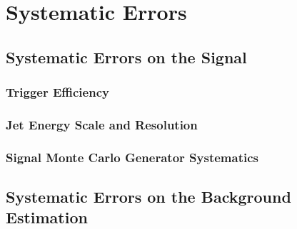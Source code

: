  

\chapter[Systematic Errors]{Systematic Errors}

\section{Systematic Errors on the Signal}
\subsection{Trigger Efficiency}
\label{sec:trigger_syst}
\subsection{Jet Energy Scale and Resolution}
\subsection{Signal Monte Carlo Generator Systematics}

\section{Systematic Errors on the Background Estimation}
